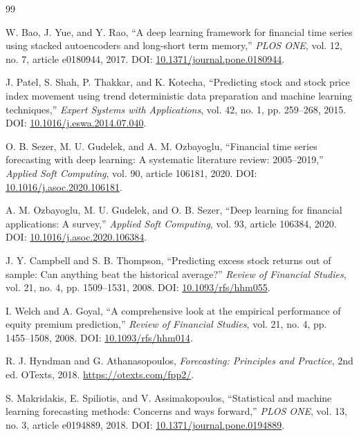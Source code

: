 \begin{thebibliography}{99}

W. Bao, J. Yue, and Y. Rao, ``A deep learning framework for financial time series using stacked autoencoders and long-short term memory,'' \emph{PLOS ONE}, vol. 12, no. 7, article e0180944, 2017. DOI: \href{https://doi.org/10.1371/journal.pone.0180944}{10.1371/journal.pone.0180944}.

J. Patel, S. Shah, P. Thakkar, and K. Kotecha, ``Predicting stock and stock price index movement using trend deterministic data preparation and machine learning techniques,'' \emph{Expert Systems with Applications}, vol. 42, no. 1, pp. 259--268, 2015. DOI: \href{https://doi.org/10.1016/j.eswa.2014.07.040}{10.1016/j.eswa.2014.07.040}.

O. B. Sezer, M. U. Gudelek, and A. M. Ozbayoglu, ``Financial time series forecasting with deep learning: A systematic literature review: 2005--2019,'' \emph{Applied Soft Computing}, vol. 90, article 106181, 2020. DOI: \href{https://doi.org/10.1016/j.asoc.2020.106181}{10.1016/j.asoc.2020.106181}.

A. M. Ozbayoglu, M. U. Gudelek, and O. B. Sezer, ``Deep learning for financial applications: A survey,'' \emph{Applied Soft Computing}, vol. 93, article 106384, 2020. DOI: \href{https://doi.org/10.1016/j.asoc.2020.106384}{10.1016/j.asoc.2020.106384}.

J. Y. Campbell and S. B. Thompson, ``Predicting excess stock returns out of sample: Can anything beat the historical average?'' \emph{Review of Financial Studies}, vol. 21, no. 4, pp. 1509--1531, 2008. DOI: \href{https://doi.org/10.1093/rfs/hhm055}{10.1093/rfs/hhm055}.

I. Welch and A. Goyal, ``A comprehensive look at the empirical performance of equity premium prediction,'' \emph{Review of Financial Studies}, vol. 21, no. 4, pp. 1455--1508, 2008. DOI: \href{https://doi.org/10.1093/rfs/hhm014}{10.1093/rfs/hhm014}.

R. J. Hyndman and G. Athanasopoulos, \emph{Forecasting: Principles and Practice}, 2nd ed. OTexts, 2018. \url{https://otexts.com/fpp2/}.

S. Makridakis, E. Spiliotis, and V. Assimakopoulos, ``Statistical and machine learning forecasting methods: Concerns and ways forward,'' \emph{PLOS ONE}, vol. 13, no. 3, article e0194889, 2018. DOI: \href{https://doi.org/10.1371/journal.pone.0194889}{10.1371/journal.pone.0194889}.


\end{thebibliography}
